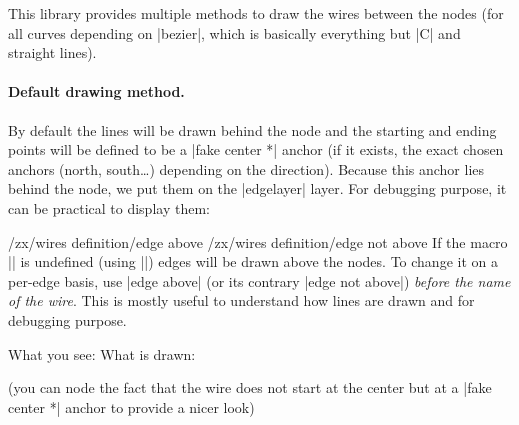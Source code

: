 \documentclass[a4paper]{ltxdoc}
\begin{document}
{This library provides multiple methods to draw the wires between the nodes (for all curves depending on |bezier|, which is basically everything but |C| and straight lines).

\paragraph{Default drawing method.}
By default the lines will be drawn behind the node and the starting and ending points will be defined to be a |fake center *| anchor (if it exists, the exact chosen anchors (north, south\dots{}) depending on the direction). Because this anchor lies behind the node, we put them on the |edgelayer| layer. For debugging purpose, it can be practical to display them:
\begin{pgfmanualentry}
  \def\extrakeytext{style, }
  \extractcommand\zxEdgesAbove\@@
  \makeatletter%
  \extractkey/zx/wires definition/edge above\@nil%
  \extractkey/zx/wires definition/edge not above\@nil%
  \makeatother
  \pgfmanualbody
  If the macro |\zxEdgesAbove| is undefined (using |\let\zxEdgesAbove\undefined|) edges will be drawn above the nodes. To change it on a per-edge basis, use |edge above| (or its contrary |edge not above|) \emph{before the name of the wire}. This is mostly useful to understand how lines are drawn and for debugging purpose.
\begin{codeexample}[]
  What you see:
  \zx{\zxZ{\alpha+\beta} \ar[dr,s] \\
                         & \zxZ{\alpha+\beta}}
  What is drawn:
\end{codeexample}
(you can node the fact that the wire does not start at the center but at a |fake center *| anchor to provide a nicer look)
\end{pgfmanualentry}

}
\end{document}
